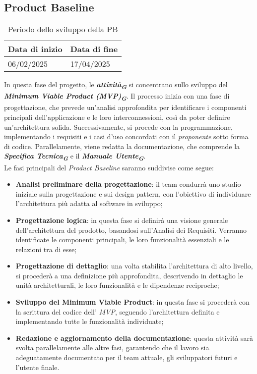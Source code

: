 \subsection{Product Baseline}
\label{sec:product baseline}
\begin{table}[h!]
    \centering
    \renewcommand{\arraystretch}{1.5} %
    \begin{tabularx}{\textwidth}{|X|X|}\hline
    \rowcolor[HTML]{FFD700} 
    \textbf{Data di inizio} & \textbf{Data di fine} \\ \hline
    06/02/2025 & 17/04/2025 \\ \hline
    \end{tabularx}
    \caption{Periodo dello sviluppo della PB}
\end{table}
In questa fase del progetto, le \textbf{\emph{attività}}\textsubscript{\textit{\textbf{G}}} si concentrano sullo sviluppo del \textbf{\emph{Minimum Viable Product (MVP)}}\textsubscript{\textit{\textbf{G}}}. 
Il processo inizia con una fase di progettazione, che prevede un’analisi approfondita per identificare i componenti principali dell’applicazione e le loro interconnessioni, così da poter definire un’architettura solida. 
Successivamente, si procede con la programmazione, implementando i requisiti e i casi d’uso concordati con il \emph{proponente} sotto forma di codice. 
Parallelamente, viene redatta la documentazione, che comprende la \textbf{\emph{Specifica Tecnica}}\textsubscript{\textit{\textbf{G}}} e il \textbf{\emph{Manuale Utente}}\textsubscript{\textit{\textbf{G}}}.\\
Le fasi principali del \emph{Product Baseline} saranno suddivise come segue:
\begin{itemize}
\item \textbf{Analisi preliminare della progettazione}: il team condurrà uno studio iniziale sulla progettazione e sui design pattern, con l’obiettivo di individuare l’architettura più adatta al software in sviluppo;
\item \textbf{Progettazione logica}: in questa fase si definirà una visione generale dell’architettura del prodotto, basandosi sull’Analisi dei Requisiti. Verranno identificate le componenti principali, le loro funzionalità essenziali e le relazioni tra di esse;
\item \textbf{Progettazione di dettaglio}: una volta stabilita l’architettura di alto livello, si procederà a una definizione più approfondita, descrivendo in dettaglio le unità architetturali, le loro funzionalità e le dipendenze reciproche;
\item \textbf{Sviluppo del Minimum Viable Product}: in questa fase si procederà con la scrittura del codice dell’ \emph{MVP}, seguendo l’architettura definita e implementando tutte le funzionalità individuate;
\item \textbf{Redazione e aggiornamento della documentazione}: questa attività sarà svolta parallelamente alle altre fasi, garantendo che il lavoro sia adeguatamente documentato per il team attuale, gli sviluppatori futuri e l’utente finale.
\end{itemize}

